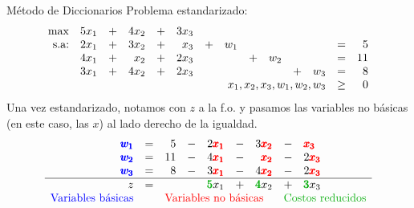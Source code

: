 \documentclass[10pt, aspectratio=169]{beamer}
\begin{document}
    \begin{frame}{Método de Diccionarios}
        Problema estandarizado:
        \vspace{0.3cm}
        \[
            \begin{array}{rrrrrrrrrrrrrr}
                \max & 5x_1 & + & 4x_2 & + & 3x_3 & \\
                \text{s.a:} & 2x_1 & + & 3x_2 & + & x_3  & + & w_1 &   &     &   &     & = & 5  \\
                & 4x_1 & + & x_2  & + & 2x_3 &   &     & + & w_2 &   &     & = & 11 \\
                & 3x_1 & + & 4x_2 & + & 2x_3 &   &     &   &     & + & w_3 & = & 8  \\
                & \multicolumn{11}{r}{x_1,x_2,x_3,w_1,w_2,w_3} & \geq & 0 \\
            \end{array}\]
        Una vez estandarizado, notamos con $z$ a la f.o. y pasamos las variables no básicas (en este caso, las $x$)
        al lado derecho de la igualdad. %
        \[
            \begin{array}{rrrrrrrll}

                \text{\textcolor{blue}{$\pmb{w_1}$}} & = & 5  & - & 2\text{\textcolor{red}{$\pmb{x_1}$}} & - & 3
                \text{\textcolor{red}{$\pmb{x_2}$}} & - & \text{\textcolor{red}{$\pmb{x_3}$}} \\
                \text{\textcolor{blue}{$\pmb{w_2}$}} & = & 11 & - & 4\text{\textcolor{red}{$\pmb{x_1}$}} & - &
                \text{\textcolor{red}{$\pmb{x_2}$}} & - & 2\text{\textcolor{red}{$\pmb{x_3}$}} \\
                \text{\textcolor{blue}{$\pmb{w_3}$}} & = & 8  & - & 3\text{\textcolor{red}{$\pmb{x_1}$}} & - & 4
                \text{\textcolor{red}{$\pmb{x_2}$}} & - & 2\text{\textcolor{red}{$\pmb{x_3}$}} \\\hline
                z                                    & = &    &   & {\color{goodgreen}\pmb{5}}x_1        & + &
                    {\color{goodgreen}\pmb{4}}x_2        & + & {\color{goodgreen}\pmb{3}}x_3        \\
                \text{\textcolor{blue}{Variables básicas}} & &
                \multicolumn{5}{l}{\text{\textcolor{red}{Variables no básicas}}} &
                \multicolumn{2}{l}{\text{\textcolor{goodgreen}{Costos reducidos}}}
            \end{array}
        \]

    \end{frame}
\end{document}
